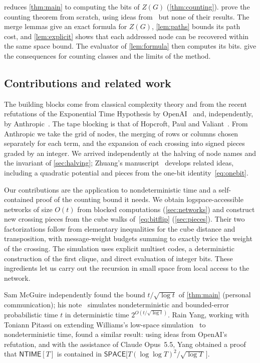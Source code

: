 \documentclass[11pt]{article}
\theoremstyle{definition}
\theoremstyle{definition}
\theoremstyle{remark}
\newcommand{\NTIME}{\mathsf{NTIME}}
\newcommand{\SPACE}{\mathsf{SPACE}}
\begin{document}
 reduces \cref{thm:main} to computing the bits of $Z(G)$ (\cref{thm:counting}).  prove the counting theorem from scratch, using ideas from~\cite{Ant26,Zhu26} but none of their results. The merge lemmas give an exact formula for $Z(G)$, \cref{lem:paths} bounds its path cost, and \cref{lem:explicit} shows that each addressed node can be recovered within the same space bound. The evaluator of \cref{lem:formula} then computes its bits.  give the consequences for counting classes and the limits of the method.

\subsection{Contributions and related work}

The building blocks come from classical complexity theory and from the recent refutations of the Exponential Time Hypothesis by OpenAI~\cite{Ope26} and, independently, by Anthropic~\cite{Ant26}. The tape blocking is that of Hopcroft, Paul and Valiant~\cite{HPV77}. From Anthropic we take the grid of nodes, the merging of rows or columns chosen separately for each term, and the expansion of each crossing into signed pieces graded by an integer. We arrived independently at the halving of node names and the invariant of \cref{sec:halving}; Zhuang's manuscript~\cite{Zhu26} develops related ideas, including a quadratic potential and pieces from the one-bit identity~\eqref{eq:onebit}.

Our contributions are the application to nondeterministic time and a self-contained proof of the counting bound it needs. We obtain logspace-accessible networks of size $O(t)$ from blocked computations (\cref{sec:networks}) and construct new crossing pieces from the cube walks of~\eqref{eq:bitflip} (\cref{sec:pieces}). Their two factorizations follow from elementary inequalities for the cube distance and transposition, with message-weight budgets summing to exactly twice the weight of the crossing. The simulation uses explicit multiset codes, a deterministic construction of the first clique, and direct evaluation of integer bits. These ingredients let us carry out the recursion in small space from local access to the network.

Sam McGuire independently found the bound $t/\sqrt{\log t}$ of \cref{thm:main} (personal communication); his note~\cite{McG26a} simulates nondeterministic and bounded-error probabilistic time $t$ in deterministic time $2^{O(t/\sqrt{\log t})}$. Rain Yang, working with Toniann Pitassi on extending Williams's low-space simulation~\cite{Wil25} to nondeterministic time, found a similar result: using ideas from OpenAI's refutation, and with the assistance of Claude Opus~5.5, Yang obtained a proof that $\NTIME[T]$ is contained in $\SPACE\bigl[T(\log\log T)^2/\sqrt{\log T}\,\bigr]$.
\end{document}

